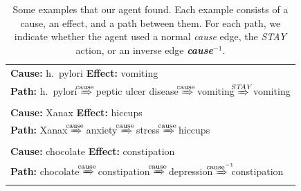 \newcommand*{\myrightarrow}[1]{\xRightarrow{\mathmakebox[4pt]{#1}}}

\begin{table}
\centering
\caption{Some examples that our agent found. Each example consists of a cause, an effect, and a path between them. For each path, we indicate whether the agent used a normal \textit{cause} edge, the \textit{STAY} action, or an inverse edge \textit{\textbf{cause}$^{-1}$}.}
\label{table-examples}
\begin{tabular}{@{}l@{}}
  \toprule
  \textbf{Cause:} h.\ pylori \hspace{0.54cm} \textbf{Effect:} vomiting \\ 
  \textbf{Path:} h.\ pylori $\myrightarrow{\text{cause}}$ peptic ulcer disease $\myrightarrow{\text{cause}}$ vomiting $\myrightarrow{\text{\textit{STAY}}}$ vomiting\\
  \midrule
  \textbf{Cause:} Xanax \hspace{0.83cm} \textbf{Effect:} hiccups \\   \textbf{Path:} Xanax $\myrightarrow{\text{cause}}$ anxiety $\myrightarrow{\text{cause}}$ stress $\myrightarrow{\text{cause}}$ hiccups \\
  \midrule
  \textbf{Cause:} chocolate \hspace{0.41cm} \textbf{Effect:} constipation \\ 
  \textbf{Path:} chocolate $\myrightarrow{\text{cause}}$ constipation $\myrightarrow{\text{cause}}$ depression $\myrightarrow{\text{cause}^{-1}}$ constipation\\
  \bottomrule
\end{tabular}
\end{table}
